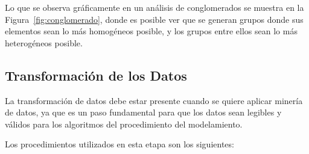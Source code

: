 Lo que se observa gráficamente en un análisis de conglomerados se muestra en la Figura~\ref{fig:conglomerado}, donde es posible ver que se generan grupos donde sus elementos sean lo más homogéneos posible, y los grupos entre ellos sean lo más heterogéneos posible. 


\subsection{Transformación de los Datos}
La transformación de datos debe estar presente cuando se quiere aplicar minería de datos, ya que es un paso fundamental para que los datos sean legibles y válidos para los algoritmos del procedimiento del modelamiento.

Los procedimientos utilizados en esta etapa son los siguientes:

